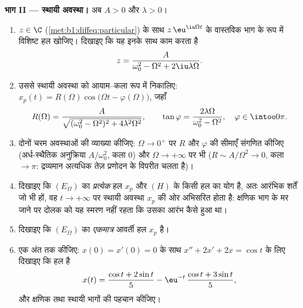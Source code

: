 \begin{problem}
\medskip \noindent\textbf{भाग II --- स्थायी अवस्था।} अब $A > 0$ और $\lambda
> 0$।
\begin{enumerate}[resume]
  \item $z \in \C$ (\cref{met:b1:diffeq:particular}) के साथ
  $z\,\eu^{\iu\Omega t}$ के वास्तविक भाग के रूप में विशिष्ट हल खोजिए। दिखाइए
  कि यह इनके साथ काम करता है
        \[
        z = \frac{A}{\omega_0^2 - \Omega^2 + 2\iu\lambda\Omega} .
        \]
  \item उससे स्थायी अवस्था को आयाम--कला रूप में निकालिए: $x_p(t) =
  R(\Omega)\cos\bigl(\Omega t - \varphi(\Omega)\bigr)$, जहाँ
        \[
        R(\Omega) = \frac{A}{\sqrt{(\omega_0^2 - \Omega^2)^2 +
        4\lambda^2\Omega^2}},
        \qquad
        \tan\varphi = \frac{2\lambda\Omega}{\omega_0^2 -
        \Omega^2},
        \quad \varphi \in \intoo0\pi .
        \]
  \item दोनों चरम अवस्थाओं की व्याख्या कीजिए: $\Omega \to 0^+$ पर $R$ और
  $\varphi$ की सीमाएँ संगणित कीजिए (अर्ध-स्थैतिक अनुक्रिया $A/\omega_0^2$,
  कला $0$) और $\Omega \to +\infty$ पर भी ($R \sim A/\Omega^2 \to 0$, कला
  $\to \pi$: द्रव्यमान अत्यधिक तेज़ प्रणोदन के विपरीत चलता है)।
  \item दिखाइए कि $(E_\Omega)$ का \emph{प्रत्येक} हल $x_p$ और $(H)$ के किसी
  हल का योग है, अतः आरंभिक शर्तें जो भी हों, वह $t \to +\infty$ पर स्थायी
  अवस्था $x_p$ की ओर अभिसरित होता है: क्षणिक भाग के मर जाने पर दोलक को यह
  स्मरण नहीं रहता कि उसका आरंभ कैसे हुआ था।
  \item दिखाइए कि $(E_\Omega)$ का \emph{एकमात्र} आवर्ती हल $x_p$ है।
  \item एक  अंत तक कीजिए: $x(0) = x'(0) = 0$ के साथ $x'' + 2x' +
  2x = \cos t$ के लिए दिखाइए कि हल है
        \[
        x(t) = \frac{\cos t + 2\sin t}5
        - \eu^{-t}\,\frac{\cos t + 3\sin t}5 ,
        \]
        और क्षणिक तथा स्थायी भागों की पहचान कीजिए।
\end{enumerate}


\end{problem}
